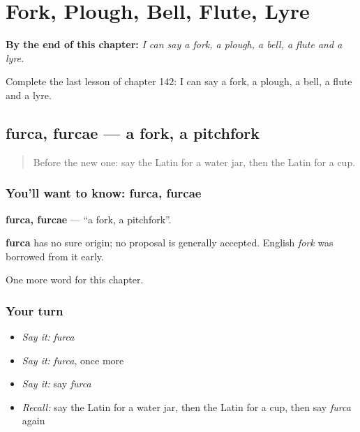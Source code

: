 
\chapter{Fork, Plough, Bell, Flute, Lyre}
\label{ch:la-fork-plough-bell-flute-lyre}

\begin{chapteropening}
\textbf{By the end of this chapter:} \emph{I can say a fork, a plough, a bell, a flute and a lyre.}

Complete the last lesson of chapter 142: I can say a fork, a plough, a bell, a flute and a lyre.
\end{chapteropening}

\section[furca, furcae]{furca, furcae — a fork, a pitchfork}

\label{lesson:LA-C142-furca}



\begin{quote}
Before the new one: say the Latin for a water jar, then the Latin for a cup.
\end{quote}

\subsection*{You'll want to know: furca, furcae}
\textbf{furca, furcae} — \textquotedblleft{}a fork, a pitchfork\textquotedblright{}.

\begin{cousinweb}
\textbf{furca} has no sure origin; no proposal is generally accepted. English \emph{fork} was borrowed from it early.
\end{cousinweb}

\begin{grammarlens}[title={What you've built}]
One more word for this chapter.
\end{grammarlens}

\subsection*{Your turn}
\begin{itemize}
\raggedright
  \item \emph{Say it:} \emph{furca}
  \item \emph{Say it:} \emph{furca}, once more
  \item \emph{Say it:} say \emph{furca}
  \item \emph{Recall:} say the Latin for a water jar, then the Latin for a cup, then say \emph{furca} again
\end{itemize}

